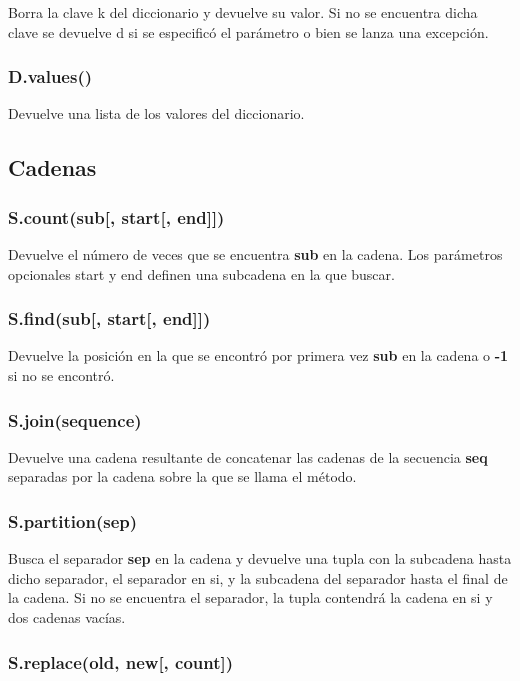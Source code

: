 \documentclass[12pt, twoside]{report}
\begin{document}
Borra la clave k del diccionario y devuelve su valor. Si no se encuentra dicha clave se devuelve d si se especificó el parámetro o bien se lanza una excepción.

\subsubsection{D.values()}

Devuelve una lista de los valores del diccionario.

\subsection{Cadenas}

\subsubsection{S.count(sub[, start[, end]])}

Devuelve el número de veces que se encuentra \textbf{sub} en la cadena. Los parámetros opcionales start y end definen una subcadena en la que buscar.

\subsubsection{S.find(sub[, start[, end]])}

Devuelve la posición en la que se encontró por primera vez \textbf{sub} en la cadena o \textbf{-1} si no se encontró.

\subsubsection{S.join(sequence)}

Devuelve una cadena resultante de concatenar las cadenas de la secuencia \textbf{seq} separadas por la cadena sobre la que se llama el método.

\subsubsection{S.partition(sep)}

Busca el separador \textbf{sep} en la cadena y devuelve una tupla con la subcadena hasta dicho separador, el separador en si, y la subcadena del separador hasta el final de la cadena. Si no se encuentra el separador, la tupla contendrá la cadena en si y dos cadenas vacías.

\subsubsection{S.replace(old, new[, count])}
\end{document}
